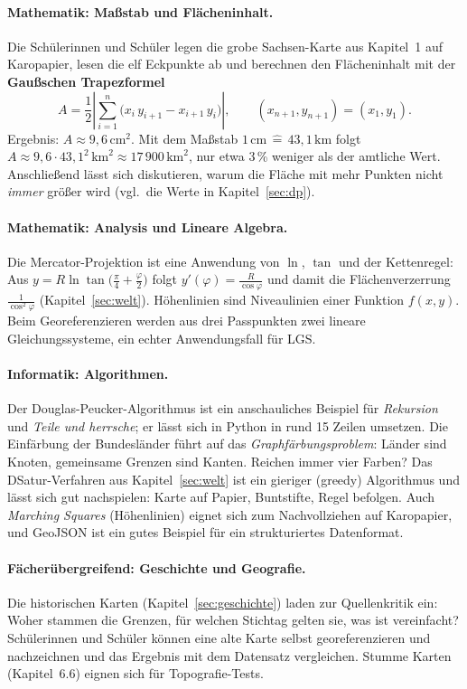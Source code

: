 \paragraph{Mathematik: Maßstab und Flächeninhalt.}
Die Schülerinnen und Schüler legen die grobe Sachsen-Karte aus Kapitel~1 auf Karopapier, lesen die elf Eckpunkte ab und berechnen den Flächeninhalt mit der \textbf{Gaußschen Trapezformel}
\[
	A = \frac12 \left|\sum_{i=1}^{n} \bigl(x_i\,y_{i+1} - x_{i+1}\,y_i\bigr)\right|,
	\qquad (x_{n+1},y_{n+1}) = (x_1,y_1).
\]
Ergebnis: $A \approx 9{,}6\,\mathrm{cm}^2$. Mit dem Maßstab $1\,\mathrm{cm} \,\hat{=}\, 43{,}1\,\mathrm{km}$ folgt $A \approx 9{,}6 \cdot 43{,}1^2\,\mathrm{km}^2 \approx 17\,900\,\mathrm{km}^2$, nur etwa 3\,\% weniger als der amtliche Wert. Anschließend lässt sich diskutieren, warum die Fläche mit mehr Punkten nicht \textit{immer} größer wird (vgl.\ die Werte in Kapitel~\ref{sec:dp}).

\paragraph{Mathematik: Analysis und Lineare Algebra.}
Die Mercator-Projektion ist eine Anwendung von $\ln$, $\tan$ und der Kettenregel: Aus $y = R\ln\tan\bigl(\frac{\pi}{4}+\frac{\varphi}{2}\bigr)$ folgt $y'(\varphi) = \frac{R}{\cos\varphi}$ und damit die Flächenverzerrung $\frac{1}{\cos^2\varphi}$ (Kapitel~\ref{sec:welt}). Höhenlinien sind Niveaulinien einer Funktion $f(x,y)$. Beim Georeferenzieren werden aus drei Passpunkten zwei lineare Gleichungssysteme, ein echter Anwendungsfall für LGS.

\paragraph{Informatik: Algorithmen.}
Der Douglas-Peucker-Algorithmus ist ein anschauliches Beispiel für \textit{Rekursion} und \textit{Teile und herrsche}; er lässt sich in Python in rund 15 Zeilen umsetzen. Die Einfärbung der Bundesländer führt auf das \textit{Graphfärbungsproblem}: Länder sind Knoten, gemeinsame Grenzen sind Kanten. Reichen immer vier Farben? Das DSatur-Verfahren aus Kapitel~\ref{sec:welt} ist ein gieriger (greedy) Algorithmus und lässt sich gut nachspielen: Karte auf Papier, Buntstifte, Regel befolgen. Auch \textit{Marching Squares} (Höhenlinien) eignet sich zum Nachvollziehen auf Karopapier, und GeoJSON ist ein gutes Beispiel für ein strukturiertes Datenformat.

\paragraph{Fächerübergreifend: Geschichte und Geografie.}
Die historischen Karten (Kapitel~\ref{sec:geschichte}) laden zur Quellenkritik ein: Woher stammen die Grenzen, für welchen Stichtag gelten sie, was ist vereinfacht? Schülerinnen und Schüler können eine alte Karte selbst georeferenzieren und nachzeichnen und das Ergebnis mit dem Datensatz vergleichen. Stumme Karten (Kapitel~6.6) eignen sich für Topografie-Tests.



